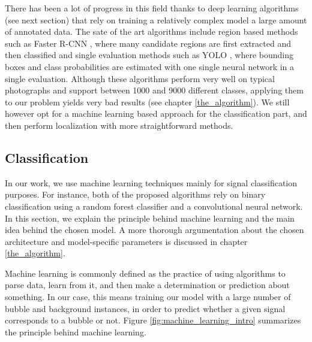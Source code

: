 	There has been a lot of progress in this field thanks to deep learning algorithms (see next section) that rely on training a relatively complex model a large amount of annotated data. The sate of the art algorithms include region based methods such as Faster R-CNN \citep{FasterRCNN}, where many candidate regions are first extracted and then classified and single evaluation methods such as YOLO \citep{YOLO}, where bounding boxes and class probabilities are estimated with one single neural network in a single evaluation. Although these algorithms perform very well on typical photographs and support between 1000 and 9000 different classes, applying them to our problem yields very bad results (see chapter \ref{the_algorithm}). We still however opt for a machine learning based approach for the classification part, and then perform localization with more straightforward methods.
		
		\subsection{Classification}\label{machine_learning}
		In our work, we use machine learning techniques mainly for signal classification purposes. For instance, both of the proposed algorithms rely on binary classification using a random forest classifier and a convolutional neural network. In this section, we explain the principle behind machine learning and the main idea behind the chosen model. A more thorough argumentation about the chosen architecture and model-specific parameters is discussed in chapter \ref{the_algorithm}.

		Machine learning is commonly defined as the practice of using algorithms to parse data, learn from it, and then make a determination or prediction about something. In our case, this means training our model with a large number of bubble and background instances, in order to predict whether a given signal corresponds to a bubble or not. Figure \ref{fig:machine_learning_intro} summarizes the principle behind machine learning. 
		
